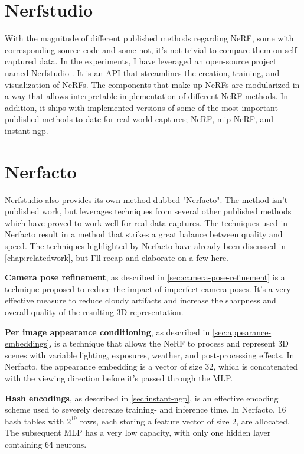 \section{Nerfstudio}
With the magnitude of different published methods regarding NeRF, some with corresponding source code and some not, it's not trivial to compare them on self-captured data. In the experiments, I have leveraged an open-source project named Nerfstudio \cite{nerfstudio}. It is an API that streamlines the creation, training, and visualization of NeRFs. The components that make up NeRFs are modularized in a way that allows interpretable implementation of different NeRF methods. In addition, it ships with implemented versions of some of the most important published methods to date for real-world captures; NeRF, mip-NeRF, and instant-ngp.

\section{Nerfacto}

Nerfstudio also provides its own method dubbed "Nerfacto". The method isn't published work, but leverages techniques from several other published methods which have proved to work well for real data captures. The techniques used in Nerfacto result in a method that strikes a great balance between quality and speed. The techniques highlighted by Nerfacto have already been discussed in \autoref{chap:relatedwork}, but I'll recap and elaborate on a few here.

\textbf{Camera pose refinement}, as described in \autoref{sec:camera-pose-refinement} is a technique proposed to reduce the impact of imperfect camera poses. It's a very effective measure to reduce cloudy artifacts and increase the sharpness and overall quality of the resulting 3D representation.

\textbf{Per image appearance conditioning}, as described in \autoref{sec:appearance-embeddings}, is a technique that allows the NeRF to process and represent 3D scenes with variable lighting, exposures, weather, and post-processing effects. In Nerfacto, the appearance embedding is a vector of size 32, which is concatenated with the viewing direction before it's passed through the MLP.

\textbf{Hash encodings}, as described in \autoref{sec:instant-ngp}, is an effective encoding scheme used to severely decrease training- and inference time. In Nerfacto, 16 hash tables with $2^{19}$ rows, each storing a feature vector of size 2, are allocated. The subsequent MLP has a very low capacity, with only one hidden layer containing 64 neurons.


